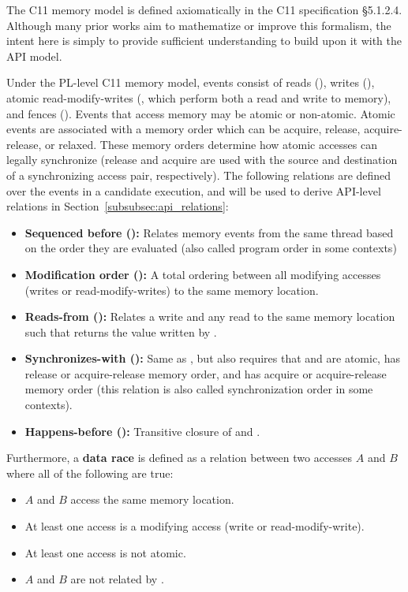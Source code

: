 The C11 memory model is defined axiomatically in the C11 specification \S5.1.2.4.
    Although many prior works aim to mathematize or improve this formalism, the intent
    here is simply to provide sufficient understanding to build upon it with the
    \openshmem API model.

Under the PL-level C11 memory model, events consist of reads (), writes
    (), atomic read-modify-writes (, which perform both a read and
    write to memory), and fences (). Events that access memory may be atomic or
    non-atomic. Atomic events are associated with a memory order which can be acquire,
    release, acquire-release, or relaxed. These memory orders determine how atomic
    accesses can legally synchronize (release and acquire are used with the source and
    destination of a synchronizing access pair, respectively). The following relations
    are defined over the events in a candidate execution, and will be used to derive
    API-level relations in Section~\ref{subsubsec:api_relations}:

\begin{itemize}
    \item \textbf{Sequenced before ():} Relates memory events from the same
        thread based on the order they are evaluated (also called program order in some
        contexts)
    \item \textbf{Modification order ():} A total ordering between all modifying
        accesses (writes or read-modify-writes) to the same memory location.
    \item \textbf{Reads-from ():} Relates a write  and any read
         to the same memory location such that  returns the value
        written by .
    \item \textbf{Synchronizes-with ():} Same as , but also requires
        that  and  are atomic,  has release or
        acquire-release memory order, and  has acquire or acquire-release
        memory order (this relation is also called synchronization order in some
        contexts).
    \item \textbf{Happens-before ():} Transitive closure of \relSW{} and
        \relSB{}.
\end{itemize}

Furthermore, a \textbf{data race} is defined as a relation between two accesses $A$ and
    $B$ where all of the following are true:
\begin{itemize}
    \item $A$ and $B$ access the same memory location.
    \item At least one access is a modifying access (write or read-modify-write).
    \item At least one access is not atomic.
    \item $A$ and $B$ are not related by \relHB{}.
\end{itemize}

